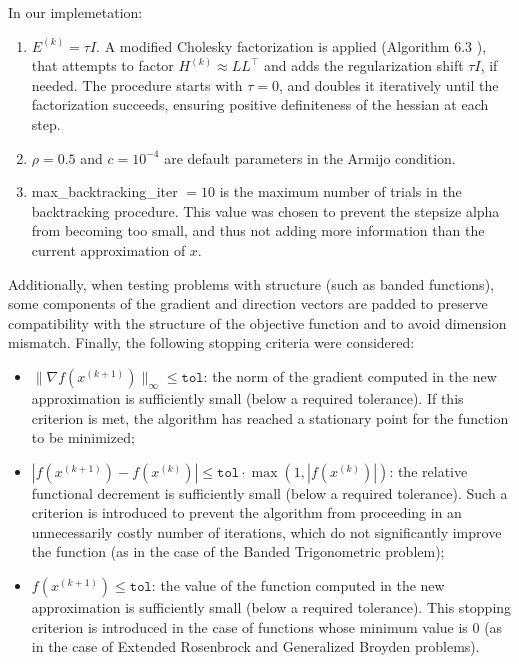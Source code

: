 \documentclass[a4paper,12pt]{article}
\begin{document}
	\noindent In our implemetation:
	\begin{enumerate}
	\item $E^{(k)} = \tau I$. A modified Cholesky factorization is applied (Algorithm 6.3 ), that attempts to factor \( H^{(k)} \approx LL^\top \) and adds the regularization shift \( \tau I \), if needed.
	The procedure starts with \( \tau = 0 \), and doubles it iteratively until the factorization succeeds, ensuring positive definiteness of the hessian at each step.
	\item $\rho = 0.5$  and ${c} = 10^{-4}$ are default parameters in the Armijo condition.
	\item max\_backtracking\_iter $= 10$ is the maximum number of trials in the backtracking procedure. This value was chosen to prevent the stepsize alpha from becoming too small, and thus not adding more information than the current approximation of $x$.
	\end{enumerate}
\noindent	Additionally, when testing problems with structure (such as banded functions), some components of the gradient and direction vectors are padded to preserve compatibility with the structure of the objective function and to avoid dimension mismatch. Finally, the following stopping criteria were considered:
	\begin{itemize}
		\item \( \|\nabla f(x^{(k+1)})\|_\infty \leq \texttt{tol} \): the norm of the gradient computed in the new approximation is sufficiently small (below a required tolerance). If this criterion is met, the algorithm has reached a stationary point for the function to be minimized; 
		\item \( |f(x^{(k+1)}) - f(x^{(k)})| \leq \texttt{tol} \cdot \max(1, |f(x^{(k)})|) \): the relative functional decrement is sufficiently small (below a required tolerance). Such a criterion is introduced to prevent the algorithm from proceeding in an unnecessarily costly number of iterations, which do not significantly improve the function (as in the case of the Banded Trigonometric problem);
		\item \( f(x^{(k+1)}) \leq \texttt{tol} \): the value of the function computed in the new approximation is sufficiently small (below a required tolerance). This stopping criterion is introduced in the case of functions whose minimum value is 0 (as in the case of Extended Rosenbrock and Generalized Broyden problems). 
	\end{itemize}    
	
\end{document}
